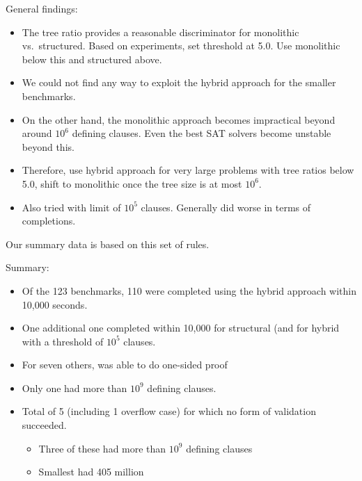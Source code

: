 \documentclass[twoside,11pt]{article}
\begin{document}
General findings:
\begin{itemize}
\item The tree ratio provides a reasonable discriminator for monolithic vs.~structured.  Based on experiments, set threshold at 5.0. Use monolithic below this and structured above.
\item We could not find any way to exploit the hybrid approach for the smaller benchmarks.
\item On the other hand, the monolithic approach becomes impractical beyond around $10^6$ defining clauses.  Even the best SAT solvers become unstable beyond this.
\item Therefore, use hybrid approach for very large problems with tree ratios below 5.0, shift to monolithic once the tree size is at most $10^6$.
\item Also tried with limit of $10^5$ clauses.  Generally did worse in terms of completions.
\end{itemize}

Our summary data is based on this set of rules.

Summary:

\begin{itemize}
\item Of the 123 benchmarks, 110 were completed using the hybrid approach within 10,000 seconds.
\item One additional one completed within 10,000 for structural (and for hybrid with a threshold of $10^5$ clauses.
\item For seven others, was able to do one-sided proof
\item Only one had more than $10^9$ defining clauses.
\item Total of 5 (including 1 overflow case) for which no form of validation succeeded.
  \begin{itemize}
  \item Three of these had more than $10^9$ defining clauses
  \item Smallest had 405 million
  
  \end{itemize}
\end{itemize}
\end{document}
